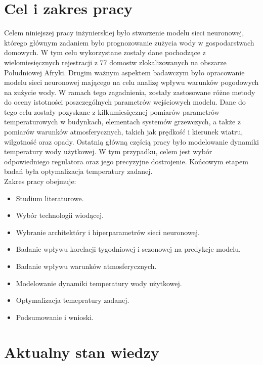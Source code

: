 \documentclass[a4paper,twoside,12pt]{book}
\begin{document}
\section{Cel i zakres pracy}
Celem niniejszej pracy inżynierskiej było stworzenie modelu sieci neuronowej, którego głównym zadaniem było prognozowanie zużycia wody w gospodarstwach domowych. W tym celu wykorzystane zostały dane pochodzące z wielomiesięcznych rejestracji z 77 domostw zlokalizowanych na obszarze Południowej Afryki. Drugim ważnym aspektem badawczym było opracowanie modelu sieci neuronowej mającego na celu analizę wpływu warunków pogodowych na zużycie wody. W ramach tego zagadnienia, zostały zastosowane różne metody do oceny istotności poszczególnych parametrów wejściowych modelu. Dane do tego celu zostały pozyskane z kilkumiesięcznej pomiarów parametrów temperaturowych w budynkach, elementach systemów grzewczych, a także z pomiarów warunków atmosferycznych, takich jak prędkość i kierunek wiatru, wilgotność oraz opady. Ostatnią główną częścią pracy było modelowanie dynamiki temperatury wody użytkowej. W tym przypadku, celem jest wybór odpowiedniego regulatora oraz jego precyzyjne dostrojenie. Końcowym etapem badań była optymalizacja temperatury zadanej.\\

Zakres pracy obejmuje:
\begin{itemize}
  \item Studium literaturowe.
  \item Wybór technologii wiodącej.
  \item Wybranie architektóry i hiperparametrów sieci neuronowej.
  \item Badanie wpływu korelacji tygodniowej i sezonowej na predykcje modelu.
  \item Badanie wpływu warunków atmosferycznych.
  \item Modelowanie dynamiki temperatury wody użytkowej.
  \item Optymalizacja temepratury zadanej.
  \item Podsumowanie i wnioski.
\end{itemize}

\section{Aktualny stan wiedzy}
\end{document}
